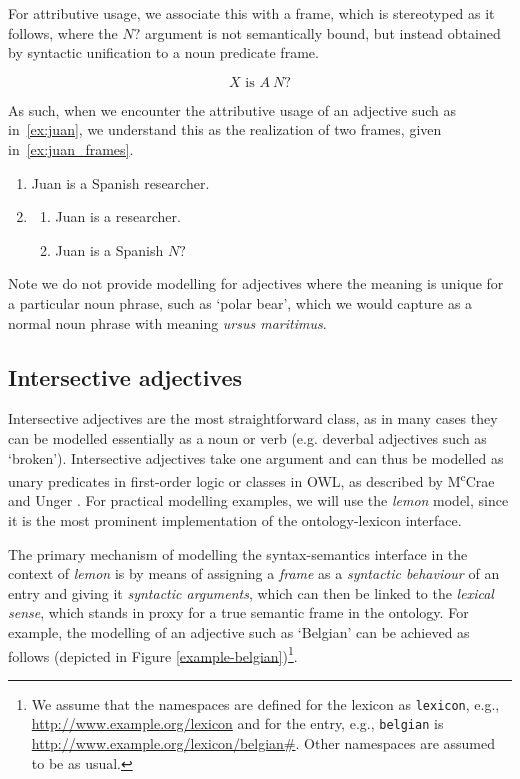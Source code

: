 \documentclass[11pt]{article}
\begin{document}
For attributive usage, we associate this with a frame, which is stereotyped as it follows,
where the $N?$ argument is not semantically bound, but instead obtained by
syntactic unification to a noun predicate frame.

\vspace{-1.0em}
$$X\text{ is }A~N?$$
\vspace{-1.5em}

As such, when we encounter the attributive usage of an adjective such as in~\ref{ex:juan}, 
we understand this as the realization of two frames, given in~\ref{ex:juan_frames}.

\begin{enumerate}
\item Juan is a Spanish researcher. \label{ex:juan}
\item \begin{enumerate}
\item Juan is a researcher.
\item Juan is a Spanish $N?$
\end{enumerate}
\label{ex:juan_frames}
\end{enumerate}

Note we do not provide modelling for adjectives where the meaning is unique for a particular noun phrase,
such as `polar bear', which we would capture as a normal noun phrase with 
meaning \emph{ursus maritimus}.

\subsection{Intersective adjectives} \label{sec:intersectives}

Intersective adjectives are the most straightforward class, as in many cases they 
can be modelled essentially as a noun or verb (e.g. deverbal adjectives such as `broken'). Intersective 
adjectives take one argument and can thus be modelled as unary predicates in first-order logic or classes in OWL, as described by M\textsuperscript{c}Crae and Unger . For practical modelling examples, we will use the
\emph{lemon} model, since it is the most prominent implementation of the 
ontology-lexicon interface.

The primary mechanism of modelling the syntax-semantics interface in the context 
of \emph{lemon} is by means of assigning a \emph{frame} as a \emph{syntactic 
behaviour} of an entry and giving it \emph{syntactic arguments}, which can then 
be linked to the \emph{lexical sense}, which stands in proxy for a true semantic 
frame in the ontology. For example, the modelling of an adjective such as 
`Belgian' can be achieved as follows (depicted in Figure 
\ref{example-belgian})\footnote{We assume that the namespaces are defined for 
the lexicon as {\tt lexicon}, e.g., \url{http://www.example.org/lexicon}
and for the entry, e.g., {\tt belgian} is \url{http://www.example.org/lexicon/belgian#}.
Other namespaces are assumed to be as usual.}.
\end{document}
